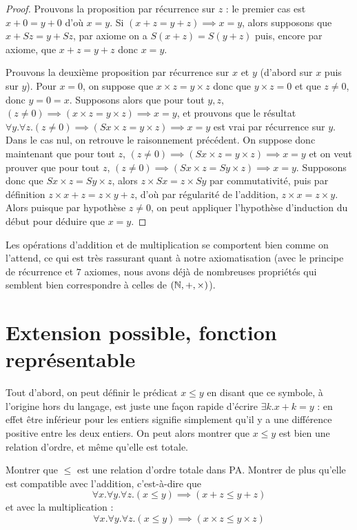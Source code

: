 \begin{proof}
    Prouvons la proposition par récurrence sur $z$ : le premier cas est $x+0=y+0$ d'où $x=y$. Si $(x+z=y+z)\implies x=y$, alors supposons que $x+Sz=y+Sz$, par axiome on a $S(x+z)=S(y+z)$ puis, encore par axiome, que $x+z=y+z$ donc $x=y$.

    Prouvons la deuxième proposition par récurrence sur $x$ et $y$ (d'abord sur $x$ puis sur $y$). Pour $x=0$, on suppose que $x\times z = y\times z$ donc que $y\times z = 0$ et que $z\neq 0$, donc $y=0=x$. Supposons alors que pour tout $y,z$, $(z\neq 0) \implies (x\times z = y\times z) \implies x=y$, et prouvons que le résultat $\forall y.\forall z.(z\neq 0)\implies (S x \times z = y\times z) \implies x =y$ est vrai par récurrence sur $y$. Dans le cas nul, on retrouve le raisonnement précédent. On suppose donc maintenant que pour tout $z$, $(z\neq 0)\implies (S x\times z = y\times z) \implies x=y$ et on veut prouver que pour tout $z$, $(z\neq 0)\implies (S x \times z = S y \times z)\implies x =y$. Supposons donc que $S x \times z = S y \times z$, alors $z\times S x = z\times S y$ par commutativité, puis par définition $z\times x + z = z\times y + z$, d'où par régularité de l'addition, $z\times x = z\times y$. Alors puisque par hypothèse $z\neq 0$, on peut appliquer l'hypothèse d'induction du début pour déduire que $x=y$.
\end{proof}



Les opérations d'addition et de multiplication se comportent bien comme on l'attend, ce qui est très rassurant quant à notre axiomatisation (avec le principe de récurrence et $7$ axiomes, nous avons déjà de nombreuses propriétés qui semblent bien correspondre à celles de $(\mathbb{N},+,\times)$).

\section{Extension possible, fonction représentable}

Tout d'abord, on peut définir le prédicat $x\leq y$ en disant que ce symbole, à l'origine hors du langage, est juste une façon rapide d'écrire $\exists k. x + k = y$ : en effet être inférieur pour les entiers signifie simplement qu'il y a une différence positive entre les deux entiers. On peut alors montrer que $x\leq y$ est bien une relation d'ordre, et même qu'elle est totale.

\begin{exo}
    Montrer que $\leq$ est une relation d'ordre totale dans PA. Montrer de plus qu'elle est compatible avec l'addition, c'est-à-dire que $$\forall x.\forall y.\forall z. (x\leq y) \implies (x+z\leq y+z)$$ et avec la multiplication : $$\forall x.\forall y.\forall z. (x\leq y)\implies (x\times z \leq y \times z)$$
\end{exo}

